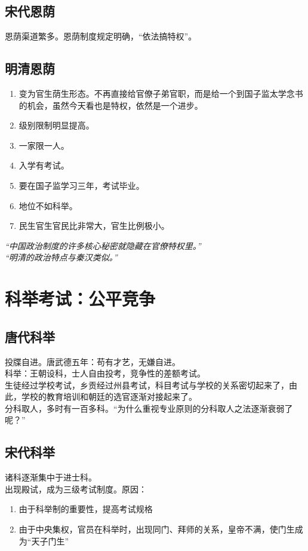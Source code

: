 \documentclass[twoside]{article}
\begin{document}
\subsection{宋代恩荫}
恩荫渠道繁多。恩荫制度规定明确，``依法搞特权''。
\subsection{明清恩荫}
\begin{enumerate}
	\item 变为官生荫生形态。不再直接给官僚子弟官职，而是给一个到国子监太学念书的机会，虽然今天看也是特权，依然是一个进步。
	\item 级别限制明显提高。
	\item 一家限一人。
	\item 入学有考试。
	\item 要在国子监学习三年，考试毕业。
	\item 地位不如科举。
	\item 民生官生官民比非常大，官生比例极小。
\end{enumerate}
\textit{``中国政治制度的许多核心秘密就隐藏在官僚特权里。''}\\
\textit{``明清的政治特点与秦汉类似。''}
\section{科举考试：公平竞争}
\subsection{唐代科举}
投牒自进。唐武德五年：苟有才艺，无嫌自进。\\
科举：王朝设科，士人自由投考，竞争性的差额考试。\\
生徒经过学校考试，乡贡经过州县考试，科目考试与学校的关系密切起来了，由此，学校的教育培训和朝廷的选官逐渐对接起来了。\\
分科取人，多时有一百多科。``为什么重视专业原则的分科取人之法逐渐衰弱了呢？''
\subsection{宋代科举}
诸科逐渐集中于进士科。\\
出现殿试，成为三级考试制度。原因：
\begin{enumerate}
	\item 由于科举制的重要性，提高考试规格
	\item 由于中央集权，官员在科举时，出现同门、拜师的关系，皇帝不满，使门生成为``天子门生''
\end{enumerate}
\end{document}
